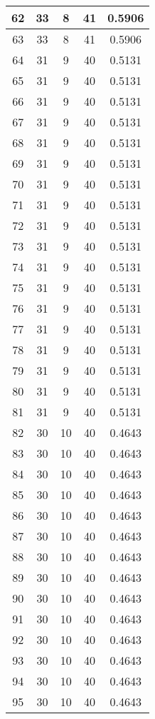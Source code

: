 \documentclass[letterpaper, 12pt]{article}
\begin{document}
\begin{longtable}{|c|c|c|c|c|}
\hline
62 & 33 & 8 & 41 & 0.5906 \\
\hline
63 & 33 & 8 & 41 & 0.5906 \\
\hline
64 & 31 & 9 & 40 & 0.5131 \\
\hline
65 & 31 & 9 & 40 & 0.5131 \\
\hline
66 & 31 & 9 & 40 & 0.5131 \\
\hline
67 & 31 & 9 & 40 & 0.5131 \\
\hline
68 & 31 & 9 & 40 & 0.5131 \\
\hline
69 & 31 & 9 & 40 & 0.5131 \\
\hline
70 & 31 & 9 & 40 & 0.5131 \\
\hline
71 & 31 & 9 & 40 & 0.5131 \\
\hline
72 & 31 & 9 & 40 & 0.5131 \\
\hline
73 & 31 & 9 & 40 & 0.5131 \\
\hline
74 & 31 & 9 & 40 & 0.5131 \\
\hline
75 & 31 & 9 & 40 & 0.5131 \\
\hline
76 & 31 & 9 & 40 & 0.5131 \\
\hline
77 & 31 & 9 & 40 & 0.5131 \\
\hline
78 & 31 & 9 & 40 & 0.5131 \\
\hline
79 & 31 & 9 & 40 & 0.5131 \\
\hline
80 & 31 & 9 & 40 & 0.5131 \\
\hline
81 & 31 & 9 & 40 & 0.5131 \\
\hline
82 & 30 & 10 & 40 & 0.4643 \\
\hline
83 & 30 & 10 & 40 & 0.4643 \\
\hline
84 & 30 & 10 & 40 & 0.4643 \\
\hline
85 & 30 & 10 & 40 & 0.4643 \\
\hline
86 & 30 & 10 & 40 & 0.4643 \\
\hline
87 & 30 & 10 & 40 & 0.4643 \\
\hline
88 & 30 & 10 & 40 & 0.4643 \\
\hline
89 & 30 & 10 & 40 & 0.4643 \\
\hline
90 & 30 & 10 & 40 & 0.4643 \\
\hline
91 & 30 & 10 & 40 & 0.4643 \\
\hline
92 & 30 & 10 & 40 & 0.4643 \\
\hline
93 & 30 & 10 & 40 & 0.4643 \\
\hline
94 & 30 & 10 & 40 & 0.4643 \\
\hline
95 & 30 & 10 & 40 & 0.4643 \\
\hline

\end{longtable}
\end{document}
